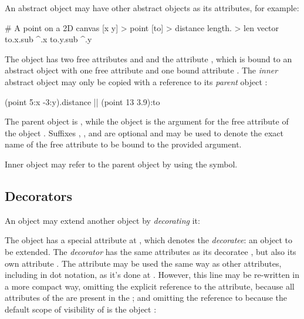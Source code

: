 An abstract object may have other abstract objects as its attributes,
for example:

\begin{ffcode}
# A point on a 2D canvas
[x y] > point
  [to] > distance
    length. > len
      vector
        to.x.sub ^.x
        to.y.sub ^.y
\end{ffcode}

The object  has two free attributes  and 
and the attribute , which is bound to an abstract
object with one free attribute  and one bound attribute .
The \emph{inner} abstract object  may only be copied
with a reference to its \emph{parent} object :

\begin{ffcode}
(point 5:x -3:y).distance |$\label{ln:point-copy}$|
  (point 13 3.9):to
\end{ffcode}

The parent object is , while the object 
is the argument for the free attribute  of the object .
Suffixes , , and  are optional and may be used
to denote the exact name of the free attribute to be bound to the
provided argument.

Inner object may refer to the parent object by using the \ff{\^{}} symbol.

\subsection{Decorators}

An object may extend another object by \emph{decorating} it:


The object  has a special attribute 
at , which denotes
the \emph{decoratee}: an object to be extended. The \emph{decorator} 
has the same attributes as its decoratee , but also
its own attribute . The attribute  may be used
the same way as other attributes, including in dot notation, as it's done
at . However, this line
may be re-written in a more compact way, omitting the explicit
reference to the  attribute, because all attributes
of the  are present in the ;
and omitting the reference to \ff{\$} because the default scope of visibility of
 is the object :

